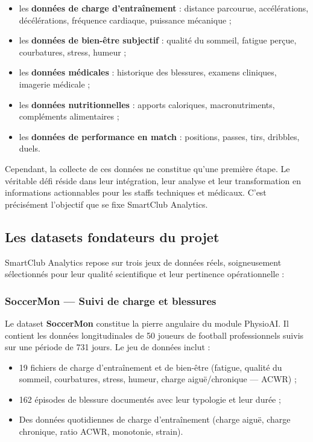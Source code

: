 \begin{itemize}
    \item les \textbf{données de charge d'entraînement} : distance parcourue, accélérations, décélérations, fréquence cardiaque, puissance mécanique ;
    \item les \textbf{données de bien-être subjectif} : qualité du sommeil, fatigue perçue, courbatures, stress, humeur ;
    \item les \textbf{données médicales} : historique des blessures, examens cliniques, imagerie médicale ;
    \item les \textbf{données nutritionnelles} : apports caloriques, macronutriments, compléments alimentaires ;
    \item les \textbf{données de performance en match} : positions, passes, tirs, dribbles, duels.
\end{itemize}

Cependant, la collecte de ces données ne constitue qu'une première étape. Le véritable défi réside dans leur intégration, leur analyse et leur transformation en informations actionnables pour les staffs techniques et médicaux. C'est précisément l'objectif que se fixe SmartClub Analytics.

\subsection{Les datasets fondateurs du projet}

SmartClub Analytics repose sur trois jeux de données réels, soigneusement sélectionnés pour leur qualité scientifique et leur pertinence opérationnelle :

\subsubsection{SoccerMon — Suivi de charge et blessures}

Le dataset \textbf{SoccerMon} \cite{soccermon} constitue la pierre angulaire du module PhysioAI. Il contient les données longitudinales de 50 joueurs de football professionnels suivis sur une période de 731 jours. Le jeu de données inclut :

\begin{itemize}
    \item 19 fichiers de charge d'entraînement et de bien-être (fatigue, qualité du sommeil, courbatures, stress, humeur, charge aiguë/chronique — ACWR) ;
    \item 162 épisodes de blessure documentés avec leur typologie et leur durée ;
    \item Des données quotidiennes de charge d'entraînement (charge aiguë, charge chronique, ratio ACWR, monotonie, strain).
\end{itemize}

